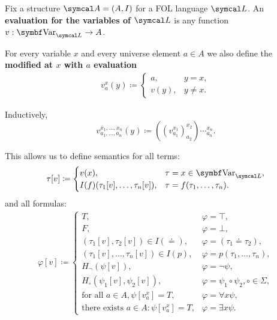 \begin{definition}\label{def:first_order_evaluation}
  Fix a structure \( \Cal{A} = (A, I) \) for a FOL language \( \Cal{L} \). An \textbf{evaluation for the variables of \( \Cal{L} \)} is any function \( v: \Bold{Var}_{\Cal{L}} \to A \).

  For every variable \( x \) and every universe element \( a \in A \) we also define the \textbf{modified at \( x \) with \( a \) evaluation}
  \begin{align*}
    v_a^x(y) \coloneqq \begin{cases}
      a,    &y = x, \\
      v(y), &y \neq x.
    \end{cases}
  \end{align*}

  Inductively,
  \begin{equation*}
    v_{a_1, \ldots, a_n}^{x_1, \ldots, x_n}(y) \coloneqq ((v_{a_1}^{x_1})_{a_2}^{x_2})\cdots_{a_n}^{x_n}.
  \end{equation*}

  This allows us to define semantics for all terms:
  \begin{align*}
    \tau[v] \coloneqq \begin{cases}
      v(x),                               &\tau = x \in \Bold{Var}_{\Cal{L}}, \\
      I(f)(\tau_1[v], \ldots, \tau_n[v]), &\tau = f(\tau_1, \ldots, \tau_n).
    \end{cases}
  \end{align*}
  and all formulas:
  \begin{align*}
    \varphi[v] \coloneqq \begin{cases}
      T,                                                &\varphi = \top, \\
      F,                                                &\varphi = \bot, \\
      (\tau_1[v], \tau_2[v]) \in I(\doteq),             &\varphi = (\tau_1 \doteq \tau_2), \\
      (\tau_1[v], \ldots, \tau_n[v]) \in I(p),          &\varphi = p(\tau_1, \ldots, \tau_n), \\
      H_\neg(\psi[v]),                                  &\varphi = \neg \psi, \\
      H_\circ(\psi_1[v], \psi_2[v]),                    &\varphi = \psi_1 \circ \psi_2, \circ \in \Sigma, \\
      \text{for all } a \in A, \psi[v_a^x] = T,         &\varphi = \forall x \psi, \\
      \text{there exists } a \in A: \psi[v_a^x] = T,    &\varphi = \exists x \psi.
    \end{cases}
  \end{align*}


\end{definition}
